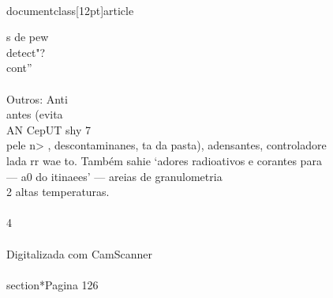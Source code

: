 \\documentclass[12pt]{article}
\begin{document}
s de pew\\
detect"?\\
cont”\\
\\
Outros: Anti\\
antes (evita\\
AN CepUT shy 7\\
pele n> , descontaminanes, ta da pasta), adensantes, controladore\\
lada rr wae to. Também sahie ‘adores radioativos e corantes para\\
— a0 do itinaees' — areias de granulometria\\
2 altas temperaturas.\\
\\
4\\
\\
Digitalizada com CamScanner\\

\\section*{Pagina 126}
\end{document}
